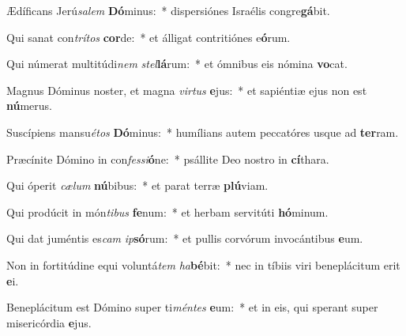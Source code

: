 \item Ædíficans Jerú\textit{sa}\textit{lem} \textbf{Dó}minus:~* dispersiónes Israélis congre\textbf{gá}bit.
\item Qui sanat con\textit{trí}\textit{tos} \textbf{cor}de:~* et álligat contritiónes e\textbf{ó}rum.
\item Qui númerat multitúdi\textit{nem} \textit{stel}\textbf{lá}rum:~* et ómnibus eis nómina \textbf{vo}cat.
\item Magnus Dóminus noster, et magna \textit{vir}\textit{tus} \textbf{e}jus:~* et sapiéntiæ ejus non est \textbf{nú}merus.
\item Suscípiens mansu\textit{é}\textit{tos} \textbf{Dó}minus:~* humílians autem peccatóres usque ad \textbf{ter}ram.
\item Præcínite Dómino in con\textit{fes}\textit{si}\textbf{ó}ne:~* psállite Deo nostro in \textbf{cí}thara.
\item Qui óperit \textit{cæ}\textit{lum} \textbf{nú}bibus:~* et parat terræ \textbf{plú}viam.
\item Qui prodúcit in món\textit{ti}\textit{bus} \textbf{fe}num:~* et herbam servitúti \textbf{hó}minum.
\item Qui dat juméntis es\textit{cam} \textit{ip}\textbf{só}rum:~* et pullis corvórum invocántibus \textbf{e}um.
\item Non in fortitúdine equi voluntá\textit{tem} \textit{ha}\textbf{bé}bit:~* nec in tíbiis viri beneplácitum erit \textbf{e}i.
\item Beneplácitum est Dómino super ti\textit{mén}\textit{tes} \textbf{e}um:~* et in eis, qui sperant super misericórdia \textbf{e}jus.
